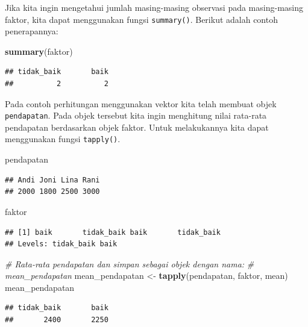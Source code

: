 \documentclass[]{book}
\newenvironment{Shaded}{\begin{snugshade}}{\end{snugshade}}
\newcommand{\KeywordTok}[1]{\textcolor[rgb]{0.13,0.29,0.53}{\textbf{#1}}}
\newcommand{\StringTok}[1]{\textcolor[rgb]{0.31,0.60,0.02}{#1}}
\newcommand{\CommentTok}[1]{\textcolor[rgb]{0.56,0.35,0.01}{\textit{#1}}}
\newcommand{\NormalTok}[1]{#1}
\begin{document}
Jika kita ingin mengetahui jumlah masing-masing observasi pada
masing-masing faktor, kita dapat menggunakan fungsi \texttt{summary()}.
Berikut adalah contoh penerapannya:

\begin{Shaded}
\begin{Highlighting}[]
\KeywordTok{summary}\NormalTok{(faktor)}
\end{Highlighting}
\end{Shaded}

\begin{verbatim}
## tidak_baik       baik 
##          2          2
\end{verbatim}

Pada contoh perhitungan menggunakan vektor kita telah membuat objek
\texttt{pendapatan}. Pada objek tersebut kita ingin menghitung nilai
rata-rata pendapatan berdasarkan objek faktor. Untuk melakukannya kita
dapat menggunakan fungsi \texttt{tapply()}.

\begin{Shaded}
\begin{Highlighting}[]
\NormalTok{pendapatan}
\end{Highlighting}
\end{Shaded}

\begin{verbatim}
## Andi Joni Lina Rani 
## 2000 1800 2500 3000
\end{verbatim}

\begin{Shaded}
\begin{Highlighting}[]
\NormalTok{faktor}
\end{Highlighting}
\end{Shaded}

\begin{verbatim}
## [1] baik       tidak_baik baik       tidak_baik
## Levels: tidak_baik baik
\end{verbatim}

\begin{Shaded}
\begin{Highlighting}[]
\CommentTok{# Rata-rata pendapatan dan simpan sebagai objek dengan nama:}
\CommentTok{# mean_pendapatan}
\NormalTok{mean_pendapatan <-}\StringTok{ }\KeywordTok{tapply}\NormalTok{(pendapatan, faktor, mean)}
\NormalTok{mean_pendapatan}
\end{Highlighting}
\end{Shaded}

\begin{verbatim}
## tidak_baik       baik 
##       2400       2250
\end{verbatim}
\end{document}
